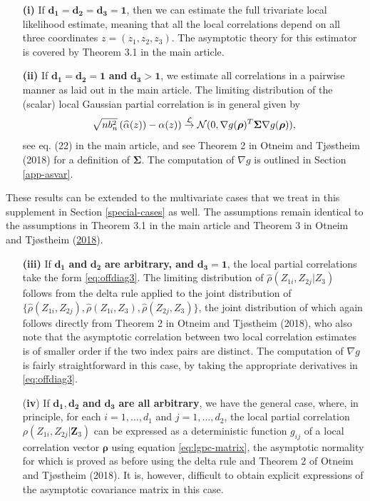 \documentclass[
  12pt,
  letterpaper]{article}
\numberwithin{equation}{section}
\newcommand{\Z}{\bm{Z}}
\newcommand{\frho}{\bm{\rho}}
\newcommand{\fSigma}{\bm{\Sigma}}
\begin{document}
\begin{itemize}
\item[\textbf{(i)}] If $\bm{d_1 = d_2 = d_3=1}$, then we can estimate the full trivariate local likelihood estimate, meaning that all the local correlations depend on all three coordinates $z=(z_1,z_2,z_3)$. The asymptotic theory for this estimator is covered by Theorem 3.1 in the main article.

\item[\textbf{(ii)}] If $\bm{d_1 = d_2 = 1}$ \textbf{and} $\bm{d_3 > 1}$, we estimate all correlations in a pairwise manner as laid out in the main article. The limiting distribution of the (scalar) local Gaussian partial correlation is in general given by 
\begin{equation}
\sqrt{nb_n^2}\left(\widehat{\alpha}(z))-\alpha(z)\right)  \stackrel {{\cal L}}{\to} {\cal N}(0,\nabla g(\frho)^{T} {\fSigma} \nabla g (\frho)),
\end{equation}
see eq. (22) in the main article, and see Theorem 2 in Otneim and Tjøstheim (2018) for a definition of $\fSigma$. The computation of $\nabla g$ is outlined in Section \ref{app-asvar}.
\end{itemize}

These results can be extended to the multivariate cases that we treat in this supplement in Section \ref{special-cases} as well. The assumptions remain identical to the assumptions in Theorem 3.1 in the main article and Theorem 3 in Otneim and Tjøstheim (\protect\hyperlink{ref-otneim2017conditional}{2018}).

\begin{itemize}
\item[\textbf{(iii)}] If $\bm{d_1}$ \textbf{and} $\bm{d_2}$ \textbf{are arbitrary, and} $\bm{d_3 = 1}$, the local partial correlations take the form \eqref{eq:offdiag3}. The limiting distribution of $\widehat\rho(Z_{1i}, Z_{2j}|Z_3)$ follows from the delta rule applied to the joint distribution of $\{\widehat\rho(Z_{1i}, Z_{2j}), \widehat\rho(Z_{1i}, Z_3), \widehat\rho(Z_{2j}, Z_3)\}$, the joint distribution of which again follows directly from Theorem 2 in Otneim and Tjøstheim (2018), who also note that the asymptotic correlation between two local correlation estimates is of smaller order if the two index pairs are distinct. The computation of $\nabla g$ is fairly straightforward in this case, by taking the appropriate derivatives in \eqref{eq:offdiag3}.

\item[(\textbf{iv})] If $\bm{d_1, d_2}$ \textbf{and} $\bm{d_3}$ \textbf{are all arbitrary}, we have the general case, where, in principle, for each $i=1,\ldots,d_1$ and $j=1,\ldots,d_2$, the local partial correlation $\rho(Z_{1i}, Z_{2j}|\Z_3)$ can be expressed as a deterministic function $g_{ij}$ of a local correlation vector $\frho$ using equation \eqref{eq:lgpc-matrix}, the asymptotic normality for which is proved as before using the delta rule and Theorem 2 of Otneim and Tjøstheim (2018). It is, however, difficult to obtain explicit expressions of the asymptotic covariance matrix in this case.
\end{itemize}
\end{document}
